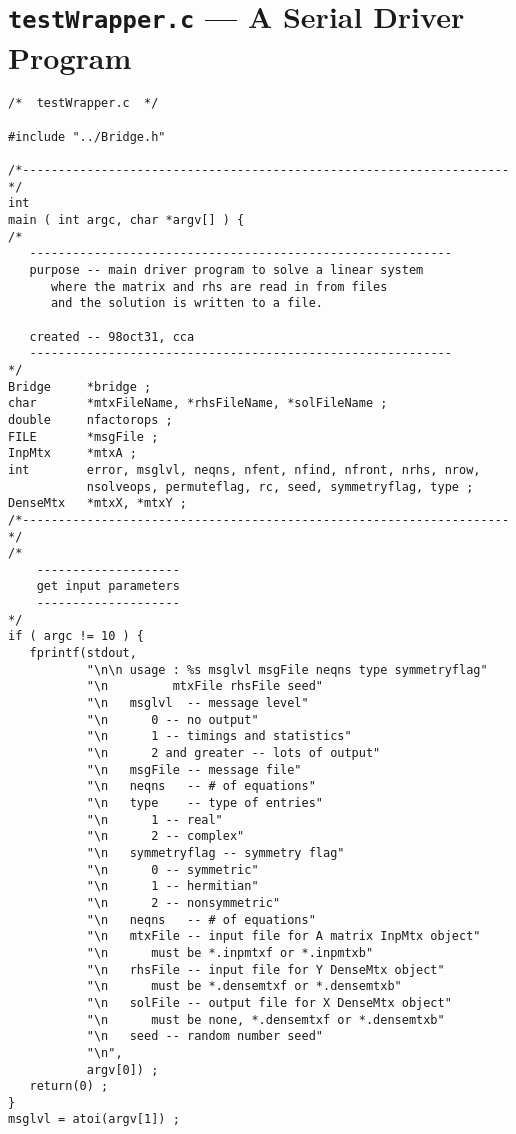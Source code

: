 \chapter{{\tt testWrapper.c} --- A Serial Driver Program}
\label{chapter:serial_driver}

\begin{verbatim}
/*  testWrapper.c  */

#include "../Bridge.h"

/*--------------------------------------------------------------------*/
int
main ( int argc, char *argv[] ) {
/*
   -----------------------------------------------------------
   purpose -- main driver program to solve a linear system
      where the matrix and rhs are read in from files
      and the solution is written to a file.

   created -- 98oct31, cca 
   -----------------------------------------------------------
*/
Bridge     *bridge ;
char       *mtxFileName, *rhsFileName, *solFileName ;
double     nfactorops ;
FILE       *msgFile ;
InpMtx     *mtxA ;
int        error, msglvl, neqns, nfent, nfind, nfront, nrhs, nrow,
           nsolveops, permuteflag, rc, seed, symmetryflag, type ;
DenseMtx   *mtxX, *mtxY ;
/*--------------------------------------------------------------------*/
/*
    --------------------
    get input parameters
    --------------------
*/
if ( argc != 10 ) {
   fprintf(stdout, 
           "\n\n usage : %s msglvl msgFile neqns type symmetryflag"
           "\n         mtxFile rhsFile seed"
           "\n   msglvl  -- message level"
           "\n      0 -- no output"
           "\n      1 -- timings and statistics"
           "\n      2 and greater -- lots of output"
           "\n   msgFile -- message file"
           "\n   neqns   -- # of equations"
           "\n   type    -- type of entries"
           "\n      1 -- real"
           "\n      2 -- complex"
           "\n   symmetryflag -- symmetry flag"
           "\n      0 -- symmetric"
           "\n      1 -- hermitian"
           "\n      2 -- nonsymmetric"
           "\n   neqns   -- # of equations"
           "\n   mtxFile -- input file for A matrix InpMtx object"
           "\n      must be *.inpmtxf or *.inpmtxb"
           "\n   rhsFile -- input file for Y DenseMtx object"
           "\n      must be *.densemtxf or *.densemtxb"
           "\n   solFile -- output file for X DenseMtx object"
           "\n      must be none, *.densemtxf or *.densemtxb"
           "\n   seed -- random number seed"
           "\n",
           argv[0]) ;
   return(0) ;
}
msglvl = atoi(argv[1]) ;

\end{verbatim}
